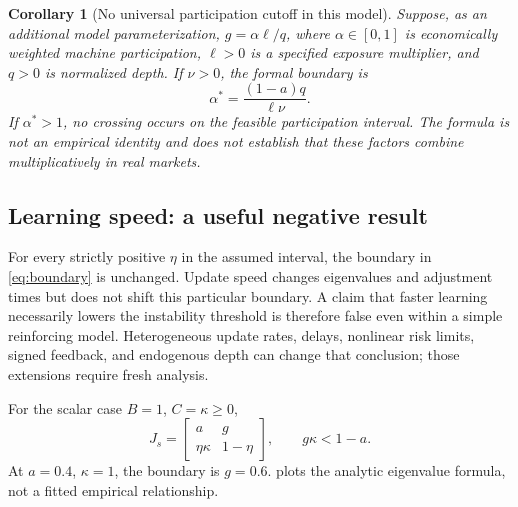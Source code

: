 \documentclass[11pt,a4paper]{article}
\newtheorem{corollary}[theorem]{Corollary}
\theoremstyle{definition}
\theoremstyle{remark}
\begin{document}
\begin{corollary}[No universal participation cutoff in this model]
\label{cor:participation}
Suppose, as an additional model parameterization, $g=\alpha\ell/q$, where $\alpha\in[0,1]$ is economically weighted machine participation, $\ell>0$ is a specified exposure multiplier, and $q>0$ is normalized depth. If $\nu>0$, the formal boundary is
\begin{equation}
 \alpha^*=\frac{(1-a)q}{\ell\nu}.
 \label{eq:alphastar}
\end{equation}
If $\alpha^*>1$, no crossing occurs on the feasible participation interval. The formula is not an empirical identity and does not establish that these factors combine multiplicatively in real markets.
\end{corollary}

\subsection{Learning speed: a useful negative result}
For every strictly positive $\eta$ in the assumed interval, the boundary in \cref{eq:boundary} is unchanged. Update speed changes eigenvalues and adjustment times but does not shift this particular boundary. A claim that faster learning necessarily lowers the instability threshold is therefore false even within a simple reinforcing model. Heterogeneous update rates, delays, nonlinear risk limits, signed feedback, and endogenous depth can change that conclusion; those extensions require fresh analysis.

For the scalar case $B=1$, $C=\kappa\geq0$,
\begin{equation}
 J_s=\begin{bmatrix}a&g\\\eta\kappa&1-\eta\end{bmatrix},
 \qquad g\kappa<1-a.
 \label{eq:scalar}
\end{equation}
At $a=0.4$, $\kappa=1$, the boundary is $g=0.6$.  plots the analytic eigenvalue formula, not a fitted empirical relationship.
\end{document}
